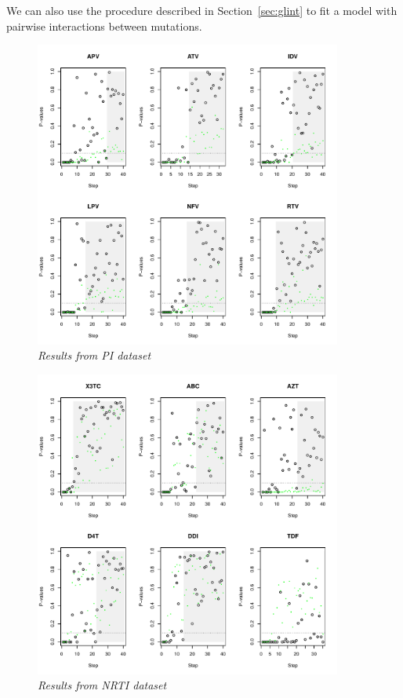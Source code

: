 \documentclass{imsart}
\begin{document}
We can also use the procedure described in Section~\ref{sec:glint} to fit a model with pairwise interactions between mutations.

\begin{figure}
\begin{center}
\includegraphics[width=0.9\textwidth]{../figs/HIV_PI_glint.pdf}
\caption{\small \it Results from PI dataset}
\label{fig:HIVPI:glint}
\end{center}
\end{figure}

\begin{figure}
\begin{center}
\includegraphics[width=0.9\textwidth]{../figs/HIV_NRTI_glint.pdf}
\caption{\small \it Results from NRTI dataset}
\label{fig:HIVNRTI:glint}
\end{center}
\end{figure}
\end{document}
